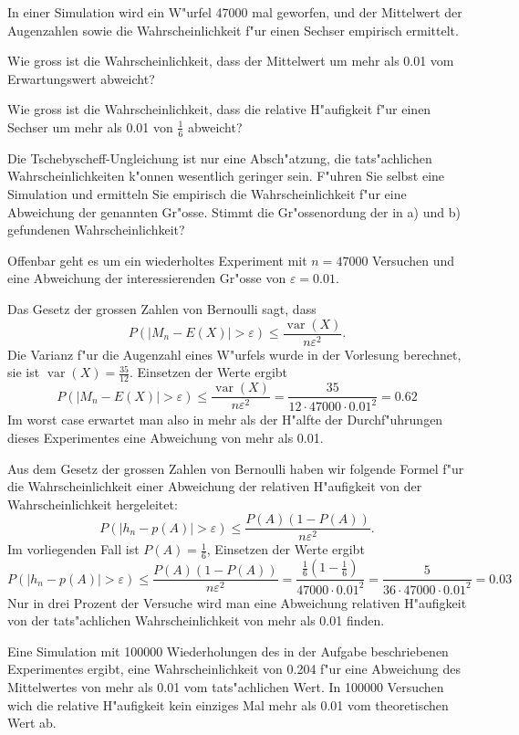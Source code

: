 In einer Simulation wird ein W"urfel 47000 mal geworfen, und der Mittelwert
der Augenzahlen sowie die Wahrscheinlichkeit f"ur einen Sechser empirisch
ermittelt.

\begin{teilaufgaben}
\item Wie gross ist die Wahrscheinlichkeit, dass der Mittelwert um mehr
als 0.01 vom Erwartungswert abweicht?
\item Wie gross ist die Wahrscheinlichkeit, dass die relative H"aufigkeit
f"ur einen Sechser um mehr als 0.01 von $\frac16$ abweicht?
\item Die Tschebyscheff-Ungleichung ist nur eine Absch"atzung, die
tats"achlichen Wahrscheinlichkeiten k"onnen wesentlich geringer sein.
F"uhren Sie selbst eine Simulation und ermitteln Sie empirisch die
Wahrscheinlichkeit f"ur eine Abweichung der genannten Gr"osse. 
Stimmt die Gr"ossenordung der in a) und b) gefundenen Wahrscheinlichkeit?
\end{teilaufgaben}


\begin{loesung}
Offenbar geht es um ein wiederholtes Experiment mit $n=47000$ Versuchen
und eine Abweichung der interessierenden Gr"osse von $\varepsilon=0.01$.
\begin{teilaufgaben}
\item
Das Gesetz der grossen Zahlen von Bernoulli sagt, dass 
\[
P(|M_n-E(X)|>\varepsilon) \le
\frac{\operatorname{var}(X)}{n\varepsilon^2}.
\]
Die Varianz f"ur die Augenzahl eines W"urfels wurde in der Vorlesung berechnet,
sie ist
$\operatorname{var}(X)=\frac{35}{12}.$
Einsetzen der Werte ergibt
\[
P(|M_n-E(X)|>\varepsilon)\le
\frac{\operatorname{var}(X)}{n\varepsilon^2}
=\frac{35}{12\cdot 47000\cdot 0.01^2}=0.62
\]
Im worst case erwartet man also in mehr als der H"alfte der Durchf"uhrungen
dieses Experimentes eine Abweichung von mehr als  0.01.
\item
Aus dem Gesetz der grossen Zahlen von Bernoulli haben wir folgende Formel
f"ur die Wahrscheinlichkeit einer Abweichung der relativen H"aufigkeit von
der Wahrscheinlichkeit hergeleitet:
\[
P(|h_n-p(A)|>\varepsilon)\le \frac{P(A)(1-P(A))}{n\varepsilon^2}.
\]
Im vorliegenden Fall ist $P(A)=\frac16$, Einsetzen der Werte ergibt
\[
P(|h_n-p(A)|>\varepsilon)\le \frac{P(A)(1-P(A))}{n\varepsilon^2}
=\frac{\frac16(1-\frac16)}{47000\cdot 0.01^2}
=\frac{5}{36\cdot 47000\cdot 0.01^2}
=0.03
\]
Nur in drei Prozent der Versuche wird man eine Abweichung relativen
H"aufigkeit von der tats"achlichen Wahrscheinlichkeit von mehr als 0.01
finden.
\item Eine Simulation mit 100000 Wiederholungen des in der Aufgabe
beschriebenen Experimentes ergibt, eine Wahrscheinlichkeit von 0.204
f"ur eine Abweichung des Mittelwertes von mehr als 0.01 vom tats"achlichen
Wert. In 100000 Versuchen wich die relative H"aufigkeit kein einziges
Mal mehr als 0.01 vom theoretischen Wert ab.
\end{teilaufgaben}
\end{loesung}


